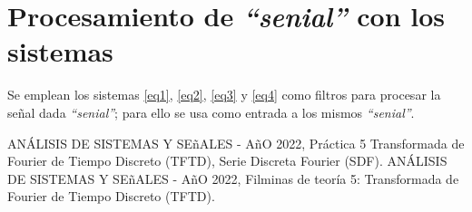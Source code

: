 \documentclass[letterpaper, 10 pt, conference]{ieeeconf}  %
\begin{document}
\section{Procesamiento de \textit{``senial''} con los sistemas}
Se emplean los sistemas \ref{eq1}, \ref{eq2}, \ref{eq3} y \ref{eq4} como filtros para procesar la se\~nal dada \textit{``senial''}; para ello se usa como entrada a los mismos \textit{``senial''}.


\begin{thebibliography}{99}

ANÁLISIS DE SISTEMAS Y SE\~{n}ALES - A\~{n}O 2022, Práctica 5 Transformada de Fourier de Tiempo Discreto (TFTD), Serie Discreta Fourier (SDF).
ANÁLISIS DE SISTEMAS Y SE\~{n}ALES - A\~{n}O 2022, Filminas de teor\'ia 5: Transformada de Fourier de Tiempo Discreto (TFTD).

\end{thebibliography}
\end{document}

